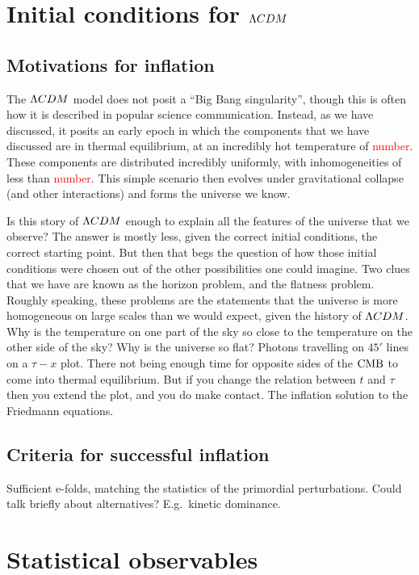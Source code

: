 \section{Initial conditions for $\Lambda CDM$}
    \subsection{Motivations for inflation}
    The $\Lambda CDM$ model does not posit a ``Big Bang singularity'', though this is often
    how it is described in popular science communication. Instead, as we have discussed, it
    posits an early epoch in which the components that we have discussed are in thermal equilibrium,
    at an incredibly hot temperature of \textcolor{red}{number}. These components are distributed incredibly uniformly,
    with inhomogeneities of less than \textcolor{red}{number}. This simple scenario then evolves
    under gravitational collapse (and other interactions) and forms the universe we know.


    Is this story of $\Lambda CDM$ enough to explain all the features of the
    universe that we observe? The answer is mostly less, given the correct initial conditions,
    the correct starting point. But then that begs the question of how those initial conditions
    were chosen out of the other possibilities one could imagine.
    Two clues that we have are known as the horizon problem, and the flatness problem.
    Roughly speaking, these problems are the statements that the universe is more homogeneous on
    large scales than we would expect, given the history of $\Lambda CDM$. Why is the temperature on one
    part of the sky so close to the temperature on the other side of the sky? Why is the universe
    so flat?
\newpage
    Photons travelling on $45'$ lines on a $\tau-x$ plot. There not being enough time for opposite
    sides of the $\text{CMB}$ to come into thermal equilibrium. But if you change the relation between
    $t$ and $\tau$ then you extend the plot, and you do make contact.
\newpage
    The inflation solution to the Friedmann equations.
\newpage
    \subsection{Criteria for successful inflation}
    Sufficient e-folds, matching the statistics of the primordial perturbations.
\newpage
    Could talk briefly about alternatives? E.g.\ kinetic dominance.
\newpage
\section{Statistical observables}
